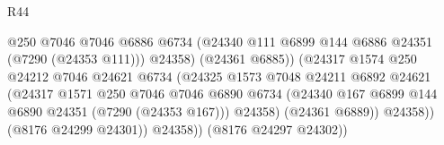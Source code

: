 \begin{lexlean}{R44}
\begin{coremodule}
{                                                @250
                                                @7046
                                                @7046
                                                @6886
                                                @6734
                                                (@24340
                                                  @111
                                                  @6899
                                                  @144
                                                  @6886
                                                  @24351
                                                  (@7290 (@24353 @111)))
                                                @24358)
                                              (@24361 @6885))
                                            (@24317
                                              @1574
                                              @250
                                              @24212
                                              @7046
                                              @24621
                                              @6734
                                              (@24325
                                                @1573
                                                @7048
                                                @24211
                                                @6892
                                                @24621
                                                (@24317
                                                  @1571
                                                  @250
                                                  @7046
                                                  @7046
                                                  @6890
                                                  @6734
                                                  (@24340
                                                    @167
                                                    @6899
                                                    @144
                                                    @6890
                                                    @24351
                                                    (@7290 (@24353 @167)))
                                                  @24358)
                                                (@24361 @6889))
                                              @24358))
                                          (@8176 @24299 @24301))
                                        @24358))
                                    (@8176 @24297 @24302))
}
\end{coremodule}
\end{lexlean}
